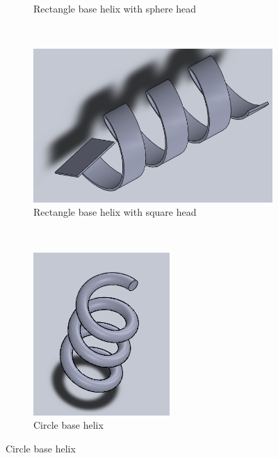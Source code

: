 \documentclass[12pt,a4paper,titlepage]{report}
\begin{document}
\begin{figure}
\begin{subfigure}[b]{0.335\textwidth}
                \caption{Rectangle base helix with sphere head}
                \label{Design4}
        \end{subfigure}~
  \begin{subfigure}[b]{0.37\textwidth}
                \includegraphics[width=\textwidth]{Design5}
                \caption{Rectangle base helix with square head }
                \label{Design5}
        \end{subfigure}~
  \begin{subfigure}[b]{0.222\textwidth}
                \includegraphics[width=\textwidth]{Design1}
                \caption{Circle base helix}
                \label{Design1}
        \end{subfigure}
      

\end{figure}
\end{document}

